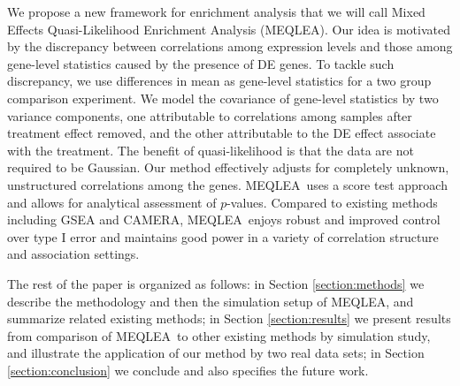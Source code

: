 \documentclass[a4,center,fleqn]{NAR}
\newcommand{\OurMethod}{MEQLEA}
\begin{document}
	We propose a new framework for enrichment analysis that we will call Mixed Effects Quasi-Likelihood
	Enrichment Analysis (\OurMethod). Our idea is motivated by the discrepancy between correlations
	among expression levels and those among gene-level statistics caused by the presence of DE genes.
	To tackle such discrepancy, we use differences in mean as gene-level statistics for a two group
	comparison experiment. We model the covariance of gene-level statistics by two variance components,
	one attributable to correlations among samples after treatment effect removed, and the other
	attributable to the DE effect associate with the treatment. The benefit of quasi-likelihood is that
	the data are not required to be Gaussian. Our method effectively adjusts for completely unknown,
	unstructured correlations among the genes. \OurMethod~uses a score test approach and allows for
	analytical assessment of $p$-values. Compared to existing methods including GSEA and CAMERA,
	\OurMethod~enjoys robust and improved control over type I error and maintains good power in a
	variety of correlation structure and association settings. 
	
	The rest of the paper is organized as follows: in Section \ref{section:methods} we describe the
	methodology and then the simulation setup of \OurMethod, and summarize related existing methods; in
	Section \ref{section:results} we present results from comparison of \OurMethod~to other existing
	methods by simulation study, and illustrate the application of our method by two real data sets; in
	Section \ref{section:conclusion} we conclude and also specifies the future work.
	
	
	
\end{document}
